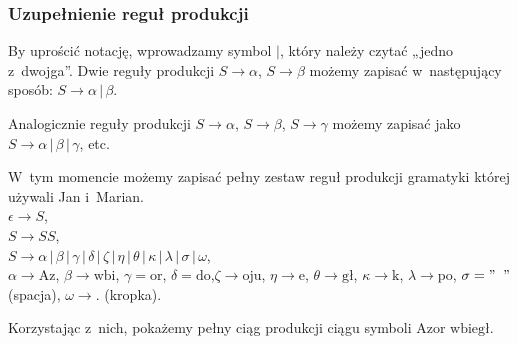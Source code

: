 \documentclass[10pt,t]{beamer}
\begin{document}
\begin{frame}
  \frametitle{Uzupełnienie reguł produkcji}


  By uprościć notację, wprowadzamy symbol $|$, który należy czytać
  „jedno z~dwojga”. Dwie reguły produkcji $S \to \alpha$, $S \to \beta$ możemy zapisać
  w~następujący sposób: $S \to \alpha \, | \, \beta$.

  Analogicznie reguły produkcji $S \to \alpha$, $S \to \beta$, $S \to \gamma$ możemy zapisać
  jako $S \to \alpha \, | \, \beta \, | \, \gamma$, etc.

  W~tym momencie możemy zapisać pełny zestaw reguł produkcji gramatyki
  której używali Jan i~Marian. \\
  $\epsilon \to S$, \\
  $S \to SS$, \\
  $S \to \alpha \, | \, \beta \, | \, \gamma \, | \, \delta \, | \, \zeta \, | \, \eta \, | \,
  \theta \, | \, \kappa \, | \, \lambda \, | \, \sigma \, | \, \omega$, \\
  $\alpha \to \text{Az}$, $\beta \to \text{wbi}$, $\gamma = \text{or}$,
  $\delta = \text{do}$,$\zeta \to \text{oju}$, $\eta \to \text{e}$,
  $\theta \to \text{gł}$, $\kappa \to \text{k}$, $\lambda \to \text{po}$,
  $\sigma = "\;\;"$ (spacja), $\omega \to .$ (kropka).

  Korzystając z~nich, pokażemy pełny ciąg produkcji ciągu symboli
  $\text{Azor wbiegł}$.




















\end{frame}
\end{document}
